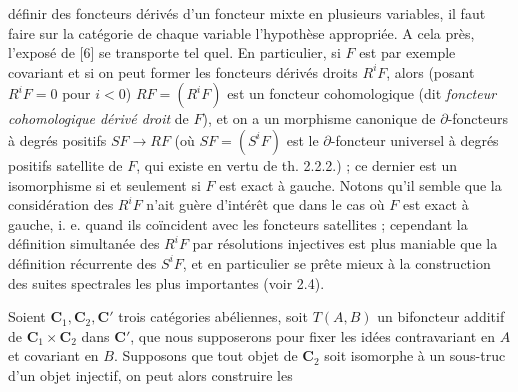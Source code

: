définir des foncteurs dérivés d'un foncteur mixte en plusieurs variables, il
faut faire sur la catégorie de chaque variable l'hypothèse appropriée. A cela
près, l'exposé de [6] se transporte tel quel.
En particulier, si $F$ est par exemple covariant et si on peut former les
foncteurs dérivés droits $R^iF$, alors (posant $R^iF=0$ pour $i<0$)
$RF=(R^iF)$ est un foncteur cohomologique (dit \textit{foncteur cohomologique
dérivé droit} de $F$), et on a un morphisme canonique de $\partial$-foncteurs
à degrés positifs $SF\to RF$ (où $SF=(S^iF)$ est le
$\partial$-foncteur universel à degrés positifs satellite de $F$, qui existe
en vertu de th. 2.2.2.) ; ce dernier est un isomorphisme si et seulement si
$F$ est exact à gauche. Notons qu'il semble que la considération des $R^iF$
n'ait guère d'intérêt que dans le cas où $F$ est exact à gauche, i. e. quand ils
coïncident avec les foncteurs satellites ; cependant la définition simultanée
des $R^iF$ par résolutions injectives est plus maniable que la définition
récurrente des $S^iF$, et en particulier se prête mieux à la construction des
suites spectrales les plus importantes (voir 2.4).

Soient $\mathbf{C}_1,\mathbf{C}_2,\mathbf{C}'$ trois catégories abéliennes, soit $T(A,B)$ un bifoncteur
additif de $\mathbf{C}_1\times \mathbf{C}_2$ dans $\mathbf{C}'$, que nous supposerons pour fixer les idées
contravariant en $A$ et covariant en $B$. Supposons que tout objet de $\mathbf{C}_2$
soit isomorphe à un sous-truc d'un objet injectif, on peut alors construire les

